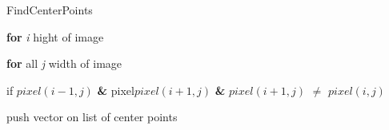 \documentclass[../Head/Main.tex]{subfiles}
\begin{document}
\begin{Pseudo}{FindCenterPoints}{}

 	\textbf{for} \textit{i} hight of image 
	\begin{Indentation}
		\item 
	\begin{Indentation}
	\item \textbf{for} all \textit{j} width of image 
	\item if $pixel(i-1,j)$ \textbf{\&} pixel$pixel(i+1,j)$ \textbf{\&} $pixel(i+1,j)$ $\neq$ $pixel(i,j)$ 
	\item push vector on list of center points
	\end{Indentation}
	
	
	\end{Indentation}
	
\end{Pseudo}
\end{document}

